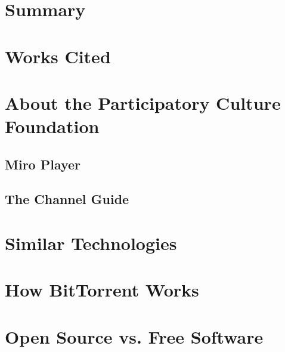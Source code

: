 \documentclass[a4paper,12pt]{report}
\begin{document}
\chapter{Summary}

\chapter{Works Cited}

\appendix

\chapter{About the Participatory Culture Foundation}

\section{Miro Player}

\section{The Channel Guide}

\chapter{Similar Technologies}

\chapter{How BitTorrent Works}

\chapter{Open Source vs. Free Software}
\end{document}
